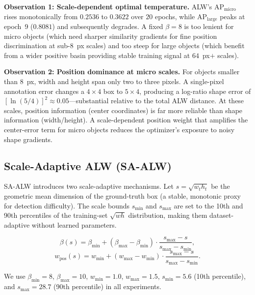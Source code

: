 \documentclass[runningheads]{llncs}
\begin{document}
\textbf{Observation 1: Scale-dependent optimal temperature.} ALW's
AP$_{\text{micro}}$ rises monotonically from $0.2536$ to $0.3622$ over
$20$ epochs, while AP$_{\text{large}}$ peaks at epoch~9 ($0.8081$) and
subsequently degrades. A fixed $\beta=8$ is too lenient for micro objects
(which need sharper similarity gradients for fine position discrimination at
sub-$8$\ px scales) and too steep for large objects (which benefit from a
wider positive basin providing stable training signal at $64$\ px$+$ scales).

\textbf{Observation 2: Position dominance at micro scales.} For objects
smaller than $8$\ px, width and height span only two to three pixels. A
single-pixel annotation error changes a $4\times4$ box to $5\times4$,
producing a log-ratio shape error of $[\ln(5/4)]^2\approx0.05$—substantial
relative to the total ALW distance. At these scales, position information
(center coordinates) is far more reliable than shape information
(width/height). A scale-dependent position weight that amplifies the
center-error term for micro objects reduces the optimizer's exposure to noisy
shape gradients.

\subsection{Scale-Adaptive ALW (SA-ALW)}
SA-ALW introduces two scale-adaptive mechanisms. Let $s=\sqrt{w_t h_t}$ be
the geometric mean dimension of the ground-truth box (a stable, monotonic
proxy for detection difficulty).
The scale bounds $s_{\text{min}}$ and $s_{\text{max}}$ are set to the 10th
and 90th percentiles of the training-set $\sqrt{wh}$ distribution, making
them dataset-adaptive without learned parameters.

\begin{equation}
\beta(s) = \beta_{\text{min}} + (\beta_{\text{max}}-\beta_{\text{min}})
          \cdot\frac{s_{\text{max}}-s}{s_{\text{max}}-s_{\text{min}}},
\label{eq:beta_s}
\end{equation}
\begin{equation}
w_{\text{pos}}(s) = w_{\text{min}} + (w_{\text{max}}-w_{\text{min}})
                   \cdot\frac{s_{\text{max}}-s}{s_{\text{max}}-s_{\text{min}}}.
\label{eq:wpos_s}
\end{equation}

We use $\beta_{\text{min}}=8$, $\beta_{\text{max}}=10$, $w_{\text{min}}=1.0$,
$w_{\text{max}}=1.5$, $s_{\text{min}}=5.6$ (10th percentile), and
$s_{\text{max}}=28.7$ (90th percentile) in all experiments.
\end{document}

